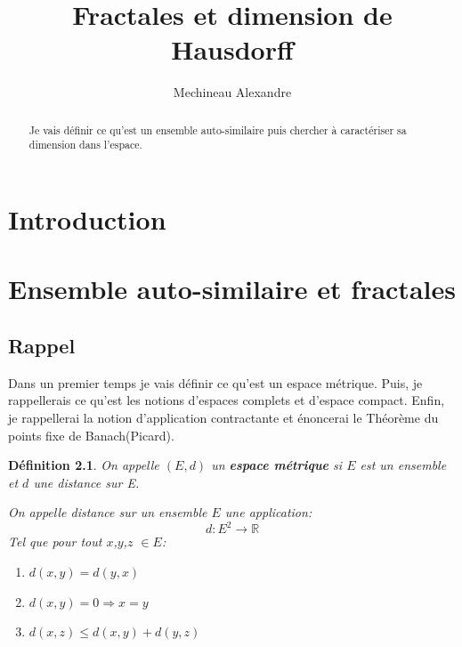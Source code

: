 \documentclass[a4paper, 12pt]{report}
\title{ \bf Fractales et dimension de Hausdorff}
\author{Mechineau Alexandre}
\begin{document}
	\newtheorem{definition}{Définition}
	\newtheorem{prop}{Proposition}
	\newtheorem{theorem}{Théorème}
	\newtheorem*{remark*}{Remarque}
	\newtheorem{lemma}{Lemme}
	
	
	\maketitle
	
	\begin{abstract}
		Je vais définir ce qu'est un ensemble auto-similaire puis chercher à caractériser sa dimension dans l'espace. 
	\end{abstract}
	
	\tableofcontents
	
	\chapter{\bf Introduction}
	
	\chapter{\bf Ensemble auto-similaire et fractales}
		\section{Rappel}
			Dans un premier temps je vais définir ce qu'est un espace métrique. Puis, je rappellerais ce qu'est les notions d'espaces complets et d'espace compact. Enfin, je rappellerai la notion d'application contractante et énoncerai le Théorème du points fixe de Banach(Picard).
			
			\begin{definition}
				On appelle $(E,d)$ un \textbf{espace métrique} si $E$ est un ensemble et $d$ une distance sur E.
				
				On appelle distance sur un ensemble $E$ une application:
				\begin{equation*}
					d:E^2\longrightarrow \mathds{R}
				\end{equation*}
			Tel que pour tout $x$,$y$,$z$ $\in E$:
				\begin{enumerate}\itemsep2pt
					\item $d(x,y)=d(y,x)$
					\item $d(x,y)=0 \Longrightarrow x=y$
					\item $d(x,z) \leq d(x,y)+d(y,z)$
				\end{enumerate}
			\end{definition}
			
\end{document}
